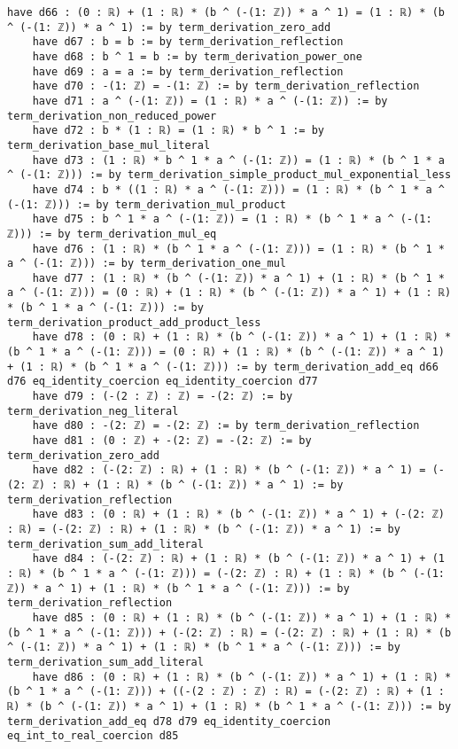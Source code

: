 \documentclass{article}
\begin{document}
\begin{tcolorbox}[colback=white!10, width=\linewidth]
\begin{lstlisting}[language=Lean4]
    have d66 : (0 : ℝ) + (1 : ℝ) * (b ^ (-(1: ℤ)) * a ^ 1) = (1 : ℝ) * (b ^ (-(1: ℤ)) * a ^ 1) := by term_derivation_zero_add
    have d67 : b = b := by term_derivation_reflection
    have d68 : b ^ 1 = b := by term_derivation_power_one
    have d69 : a = a := by term_derivation_reflection
    have d70 : -(1: ℤ) = -(1: ℤ) := by term_derivation_reflection
    have d71 : a ^ (-(1: ℤ)) = (1 : ℝ) * a ^ (-(1: ℤ)) := by term_derivation_non_reduced_power
    have d72 : b * (1 : ℝ) = (1 : ℝ) * b ^ 1 := by term_derivation_base_mul_literal
    have d73 : (1 : ℝ) * b ^ 1 * a ^ (-(1: ℤ)) = (1 : ℝ) * (b ^ 1 * a ^ (-(1: ℤ))) := by term_derivation_simple_product_mul_exponential_less
    have d74 : b * ((1 : ℝ) * a ^ (-(1: ℤ))) = (1 : ℝ) * (b ^ 1 * a ^ (-(1: ℤ))) := by term_derivation_mul_product
    have d75 : b ^ 1 * a ^ (-(1: ℤ)) = (1 : ℝ) * (b ^ 1 * a ^ (-(1: ℤ))) := by term_derivation_mul_eq
    have d76 : (1 : ℝ) * (b ^ 1 * a ^ (-(1: ℤ))) = (1 : ℝ) * (b ^ 1 * a ^ (-(1: ℤ))) := by term_derivation_one_mul
    have d77 : (1 : ℝ) * (b ^ (-(1: ℤ)) * a ^ 1) + (1 : ℝ) * (b ^ 1 * a ^ (-(1: ℤ))) = (0 : ℝ) + (1 : ℝ) * (b ^ (-(1: ℤ)) * a ^ 1) + (1 : ℝ) * (b ^ 1 * a ^ (-(1: ℤ))) := by term_derivation_product_add_product_less
    have d78 : (0 : ℝ) + (1 : ℝ) * (b ^ (-(1: ℤ)) * a ^ 1) + (1 : ℝ) * (b ^ 1 * a ^ (-(1: ℤ))) = (0 : ℝ) + (1 : ℝ) * (b ^ (-(1: ℤ)) * a ^ 1) + (1 : ℝ) * (b ^ 1 * a ^ (-(1: ℤ))) := by term_derivation_add_eq d66 d76 eq_identity_coercion eq_identity_coercion d77
    have d79 : (-(2 : ℤ) : ℤ) = -(2: ℤ) := by term_derivation_neg_literal
    have d80 : -(2: ℤ) = -(2: ℤ) := by term_derivation_reflection
    have d81 : (0 : ℤ) + -(2: ℤ) = -(2: ℤ) := by term_derivation_zero_add
    have d82 : (-(2: ℤ) : ℝ) + (1 : ℝ) * (b ^ (-(1: ℤ)) * a ^ 1) = (-(2: ℤ) : ℝ) + (1 : ℝ) * (b ^ (-(1: ℤ)) * a ^ 1) := by term_derivation_reflection
    have d83 : (0 : ℝ) + (1 : ℝ) * (b ^ (-(1: ℤ)) * a ^ 1) + (-(2: ℤ) : ℝ) = (-(2: ℤ) : ℝ) + (1 : ℝ) * (b ^ (-(1: ℤ)) * a ^ 1) := by term_derivation_sum_add_literal
    have d84 : (-(2: ℤ) : ℝ) + (1 : ℝ) * (b ^ (-(1: ℤ)) * a ^ 1) + (1 : ℝ) * (b ^ 1 * a ^ (-(1: ℤ))) = (-(2: ℤ) : ℝ) + (1 : ℝ) * (b ^ (-(1: ℤ)) * a ^ 1) + (1 : ℝ) * (b ^ 1 * a ^ (-(1: ℤ))) := by term_derivation_reflection
    have d85 : (0 : ℝ) + (1 : ℝ) * (b ^ (-(1: ℤ)) * a ^ 1) + (1 : ℝ) * (b ^ 1 * a ^ (-(1: ℤ))) + (-(2: ℤ) : ℝ) = (-(2: ℤ) : ℝ) + (1 : ℝ) * (b ^ (-(1: ℤ)) * a ^ 1) + (1 : ℝ) * (b ^ 1 * a ^ (-(1: ℤ))) := by term_derivation_sum_add_literal
    have d86 : (0 : ℝ) + (1 : ℝ) * (b ^ (-(1: ℤ)) * a ^ 1) + (1 : ℝ) * (b ^ 1 * a ^ (-(1: ℤ))) + ((-(2 : ℤ) : ℤ) : ℝ) = (-(2: ℤ) : ℝ) + (1 : ℝ) * (b ^ (-(1: ℤ)) * a ^ 1) + (1 : ℝ) * (b ^ 1 * a ^ (-(1: ℤ))) := by term_derivation_add_eq d78 d79 eq_identity_coercion eq_int_to_real_coercion d85

\end{lstlisting}
\end{tcolorbox}
\end{document}
